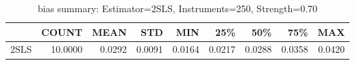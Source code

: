 \begin{table}[ht]
\centering
\caption{bias summary: Estimator=2SLS, Instruments=250, Strength=0.70}
\begin{tabular}{lrrrrrrrr}
\toprule
 & COUNT & MEAN & STD & MIN & 25\% & 50\% & 75\% & MAX \\
\midrule
2SLS & 10.0000 & 0.0292 & 0.0091 & 0.0164 & 0.0217 & 0.0288 & 0.0358 & 0.0420 \\
\bottomrule
\end{tabular}
\end{table}
